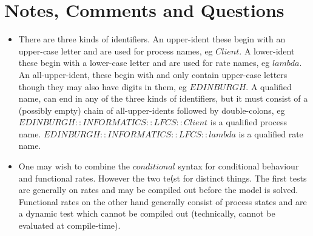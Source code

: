 \documentclass[10pt,a4paper]{article}
\begin{document}
\section{Notes, Comments and Questions}
\begin{itemize}
\item
There are three kinds of identifiers.
An upper-ident these begin with an upper-case letter and are used for
process names, eg $Client$.
A lower-ident these begin with a lower-case letter and are used for rate names,
eg $lambda$.
An all-upper-ident, these begin with and only contain upper-case letters though 
they may also have digits in them, eg $EDINBURGH$.
A qualified name, can end in any of the three kinds of identifiers, but it must
consist of a (possibly empty) chain of all-upper-idents followed
by double-colons, eg
$EDINBURGH::INFORMATICS::LFCS::Client$ is a qualified process name.
$EDINBURGH::INFORMATICS::LFCS::lambda$ is a qualified rate name.

\item
One may wish to combine the $conditional$ syntax for conditional behaviour and
functional rates. However the two te⟨st for distinct things. The first tests are
generally on rates and may be compiled out before the model is solved.
Functional rates on the other hand generally consist of process states and 
are a dynamic test which cannot be compiled out
(technically, cannot be evaluated at compile-time).

\end{itemize}

%
%
\end{document}
